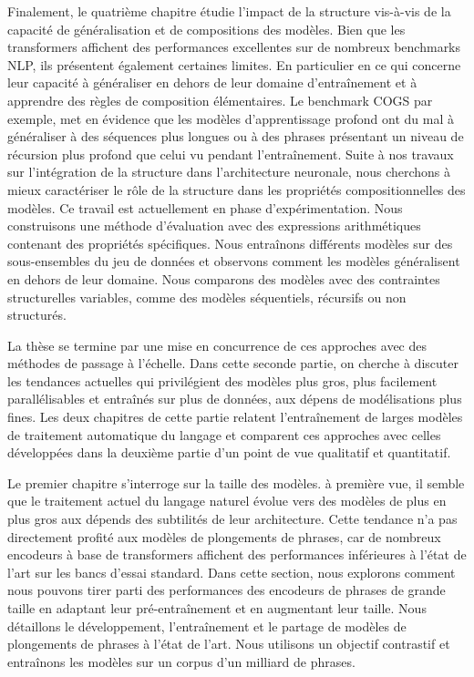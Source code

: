 Finalement, le quatrième chapitre étudie l’impact de la structure vis-à-vis de la capacité de généralisation et de compositions des modèles. Bien que les transformers affichent des performances excellentes sur de nombreux benchmarks NLP, ils présentent également certaines limites. En particulier en ce qui concerne leur capacité à généraliser en dehors de leur domaine d'entraînement et à apprendre des règles de composition élémentaires. Le benchmark COGS par exemple, met en évidence que les modèles d'apprentissage profond ont du mal à généraliser à des séquences plus longues ou à des phrases présentant un niveau de récursion plus profond que celui vu pendant l'entraînement. Suite à nos travaux sur l'intégration de la structure dans l'architecture neuronale, nous cherchons à mieux caractériser le rôle de la structure dans les propriétés compositionnelles des modèles. Ce travail est actuellement en phase d'expérimentation. Nous construisons une méthode d'évaluation avec des expressions arithmétiques contenant des propriétés spécifiques. Nous entraînons différents modèles sur des sous-ensembles du jeu de données et observons comment les modèles généralisent en dehors de leur domaine. Nous comparons des modèles avec des contraintes structurelles variables, comme des modèles séquentiels, récursifs ou non structurés.

La thèse se termine par une mise en concurrence de ces approches avec des méthodes de passage à l’échelle. Dans cette seconde partie, on cherche à discuter les tendances actuelles qui privilégient des modèles plus gros, plus facilement parallélisables et entraînés sur plus de données, aux dépens de modélisations plus fines. Les deux chapitres de cette partie relatent l'entraînement de larges modèles de traitement automatique du langage et comparent ces approches avec celles développées dans la deuxième partie d’un point de vue qualitatif et quantitatif. 

Le premier chapitre s’interroge sur la taille des modèles. à première vue, il semble que le traitement actuel du langage naturel évolue vers des modèles de plus en plus gros aux dépends des subtilités de leur architecture. Cette tendance n’a pas directement profité aux modèles de plongements de phrases, car de nombreux encodeurs à base de transformers affichent des performances inférieures à l'état de l'art sur les bancs d'essai standard. Dans cette section, nous explorons comment nous pouvons tirer parti des performances des encodeurs de phrases de grande taille en adaptant leur pré-entraînement et en augmentant leur taille. Nous détaillons le développement, l'entraînement et le partage de modèles de plongements de phrases à l’état de l’art. Nous utilisons un objectif contrastif et entraînons les modèles sur un corpus d'un milliard de phrases. 

